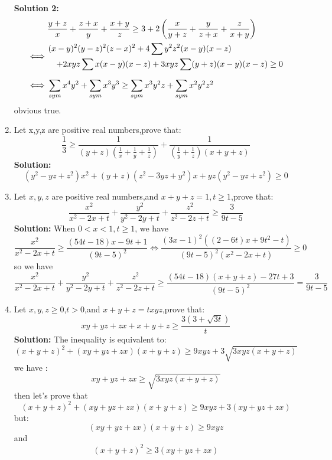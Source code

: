 \documentclass{report}
\begin{document}
\begin{enumerate}
	\begin{flushright}
	\end{flushright}
	\textbf{Solution 2:}\begin{align*}
	&\frac {y + z}{x} + \frac {z + x}{y} + \frac {x + y}{z} \geq 3 + 2\left( \frac {x}{y + z} + \frac {y}{z + x} + \frac {z}{x + y}\right) \\
	\iff & \splitdfrac{\displaystyle{(x - y)^2(y - z)^2(z - x)^2 + 4\sum y^2z^2(x - y)(x - z)}}{\displaystyle{+ 2xyz\sum x(x - y)(x - z) + 3xyz\sum (y + z)(x - y)(x - z)\geq0}}\\[2mm]
	\iff & \sum_{sym}x^4y^2+\sum_{sym}x^3y^3\geq\sum_{sym}x^3y^2z+\sum_{sym}x^2y^2z^2
	\end{align*}obvious true.
	\begin{flushright}
	\end{flushright}
	\item Let x,y,z are positive real numbers,prove that:$$ \frac {1}{3} \geq \frac {1}{(y + z)\left( \frac {1}{x} + \frac {1}{y} + \frac {1}{z}\right) } + \frac {1}{\left( \frac {1}{y} + \frac {1}{z}\right) \left( x + y + z\right) }$$
	\textbf{Solution:} $$\left(y^2 - yz + z^2\right)x^2 + (y + z)\left(z^2 - 3yz + y^2\right)x + yz\left(y^2 - yz + z^2\right) \geq 0$$
	\begin{flushright}
	\end{flushright}
\item  Let $ x,y,z$ are positive real numbers,and $ x+y+z=1,t \geq 1$,prove that:$$ \frac{x^2}{x^2-2x+t}+\frac{y^2}{y^2-2y+t}+\frac{z^2}{z^2-2z+t} 
\geq  \frac{3}{9t-5}$$
\textbf{Solution:} When $ 0<x<1, t \ge 1$, we have$$ \frac {x^2}{x^2 - 2x + t} \ge \frac{(54t-18)x-9t+1}{(9t-5)^2} \iff \frac{(3 x-1)^2((2-6t)x+9t^2-t)}{(9t-5)^2(x^2-2x+t)} \ge 0$$so we have$$ \frac {x^2}{x^2 - 2x + t} + \frac {y^2}{y^2 - 2y + t} + \frac {z^2}{z^2 - 2z + t}\geq \frac{(54t-18)(x+y+z)-27t+3}{(9t-5)^2} =\frac{3}{9t-5}$$
\begin{flushright}
\end{flushright}
\item Let $ x,y,z \geq 0$,$ t > 0$,and $ x + y + z = txyz$,prove that:$$ xy + yz + zx + x + y + z \geq \frac {3(3 + \sqrt {3t})}{t}$$
\textbf{Solution:} The inequality is equivalent to:$$ (x+y+z)^{2}+(xy+yz+zx)(x+y+z)\geq9xyz+3\sqrt{3xyz(x+y+z)}$$we have : $$ xy+yz+zx\geq \sqrt{3xyz(x+y+z)}$$then let's prove that$$ (x+y+z)^{2}+(xy+yz+zx)(x+y+z)\geq9xyz+3(xy+yz+zx)$$but:$$ (xy+yz+zx)(x+y+z)\geq9xyz$$ and $$ (x+y+z)^{2}\geq3(xy+yz+zx)$$
\begin{flushright}
\end{flushright}

\end{enumerate}
\end{document}
